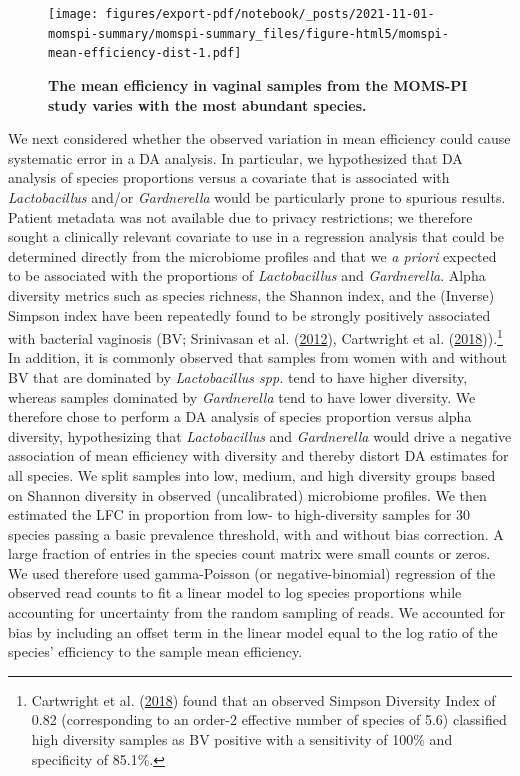 \documentclass[
]{article}
\begin{document}
\begin{figure}
\centering
\texttt{[image: figures/export-pdf/notebook/\_posts/2021-11-01-momspi-summary/momspi-summary\_files/figure-html5/momspi-mean-efficiency-dist-1.pdf]}
\caption{\label{fig:momspi-mean-efficiency-dist}\textbf{The mean efficiency in vaginal samples from the MOMS-PI study varies with the most abundant species.}}
\end{figure}



We next considered whether the observed variation in mean efficiency could cause systematic error in a DA analysis.
In particular, we hypothesized that DA analysis of species proportions versus a covariate that is associated with \emph{Lactobacillus} and/or \emph{Gardnerella} would be particularly prone to spurious results.
Patient metadata was not available due to privacy restrictions; we therefore sought a clinically relevant covariate to use in a regression analysis that could be determined directly from the microbiome profiles and that we \emph{a priori} expected to be associated with the proportions of \emph{Lactobacillus} and \emph{Gardnerella}.
Alpha diversity metrics such as species richness, the Shannon index, and the (Inverse) Simpson index have been repeatedly found to be strongly positively associated with bacterial vaginosis (BV; Srinivasan et al. (\protect\hyperlink{ref-srinivasan2012bact}{2012}), Cartwright et al. (\protect\hyperlink{ref-cartwright2018mult}{2018})).\footnote{Cartwright et al. (\protect\hyperlink{ref-cartwright2018mult}{2018}) found that an observed Simpson Diversity Index of 0.82 (corresponding to an order-2 effective number of species of 5.6) classified high diversity samples as BV positive with a sensitivity of 100\% and specificity of 85.1\%.}
In addition, it is commonly observed that samples from women with and without BV that are dominated by \emph{Lactobacillus spp.} tend to have higher diversity, whereas samples dominated by \emph{Gardnerella} tend to have lower diversity.
We therefore chose to perform a DA analysis of species proportion versus alpha diversity, hypothesizing that \emph{Lactobacillus} and \emph{Gardnerella} would drive a negative association of mean efficiency with diversity and thereby distort DA estimates for all species.
We split samples into low, medium, and high diversity groups based on Shannon diversity in observed (uncalibrated) microbiome profiles.
We then estimated the LFC in proportion from low- to high-diversity samples for 30 species passing a basic prevalence threshold, with and without bias correction.
A large fraction of entries in the species count matrix were small counts or zeros.
We used therefore used gamma-Poisson (or negative-binomial) regression of the observed read counts to fit a linear model to log species proportions while accounting for uncertainty from the random sampling of reads.
We accounted for bias by including an offset term in the linear model equal to the log ratio of the species' efficiency to the sample mean efficiency.
\end{document}
